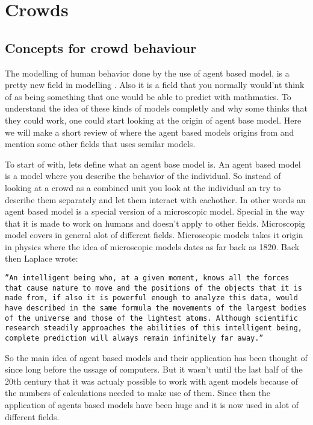 \section{Crowds}
\subsection{Concepts for crowd behaviour}
The modelling of human behavior done by the use of agent based model, is a pretty new field in modelling \cite{helbing00}. Also it is a field that you normally would'nt think of as being something that one would be able to predict with mathmatics. To understand the idea of these kinds of models completly and why some thinks that they could work, one could start looking at the origin of agent base model. Here we will make a short review of where the agent based models origins from and mention some other fields that uses semilar models. 

To start of with, lets define what an agent base model is. An agent based model is a model where you describe the behavior of the individual. So instead of looking at a crowd as a combined unit you look at the individual an try to describe them separately and let them interact with eachother. In other words an agent based model is a special version of a microscopic model. Special in the way that it is made to work on humans and doesn't apply to other fields. Microscopig model covers in general alot of different fields. Microscopic models takes it origin in physics where the idea of microscopic models dates as far back as 1820. Back then Laplace wrote\cite{simintro}:
\begin{center}
\begin{minipage}[c]{5in}
\texttt{''An intelligent being who, at a given moment,
knows all the forces that cause nature to move and
the positions of the objects that it is made from, if
also it is powerful enough to analyze this data, would
have described in the same formula the movements of
the largest bodies of the universe and those of the
lightest atoms. Although scientific research steadily
approaches the abilities of this intelligent being, complete
prediction will always remain infinitely far away.''}
\end{minipage}
\end{center}

So the main idea of agent based models and their application has been thought of since long before the ussage of computers. But it wasn't until the last half of the 20th century that it was actualy possible to work with agent models because of the numbers of calculations needed to make use of them\cite{simintro}. Since then the application of agents based models have been huge and it is now used in alot of different fields. 


